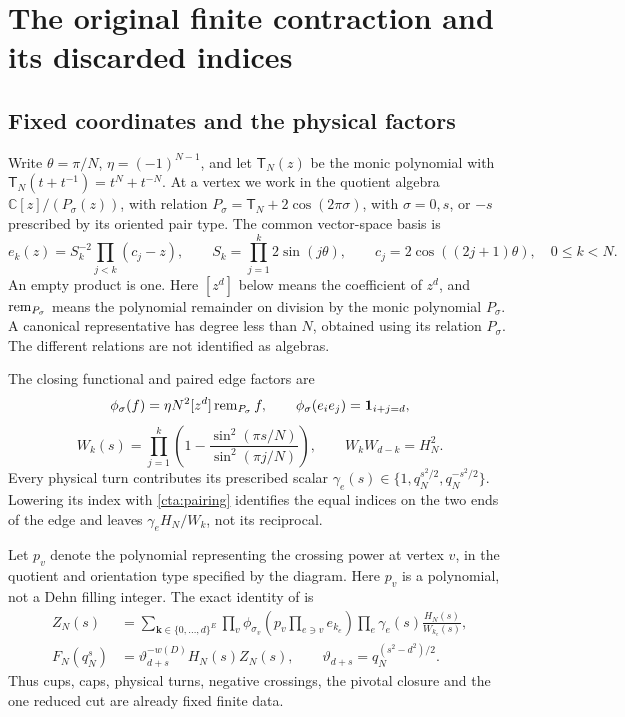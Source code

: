 \section{The original finite contraction and its discarded indices}
\label{cta:finite}

\subsection{Fixed coordinates and the physical factors}
Write \(\theta=\pi/N\), \(\eta=(-1)^{N-1}\), and let
\(\mathsf T_N(z)\) be the monic polynomial with
\(\mathsf T_N(t+t^{-1})=t^N+t^{-N}\). At a vertex we work in the quotient algebra
$\mathbb C[z]/(P_\sigma(z))$, with relation \(P_\sigma=\mathsf T_N+2\cos(2\pi\sigma)\), with
\(\sigma=0,s\), or \(-s\) prescribed by its oriented pair type.
The common vector-space basis is
\begin{equation}\label{cta:basis}
 e_k(z)=S_k^{-2}\prod_{j<k}(c_j-z),\qquad
 S_k=\prod_{j=1}^k2\sin(j\theta),\qquad
 c_j=2\cos((2j+1)\theta),\quad 0\le k<N.
\end{equation}
An empty product is one. Here $[z^d]$ below means the coefficient of $z^d$, and
$\operatorname{rem}_{P_\sigma}$ means the polynomial remainder on division by
the monic polynomial $P_\sigma$. A canonical representative has degree
less than \(N\), obtained using its relation \(P_\sigma\).
The different relations are not identified as algebras.

The closing functional and paired edge factors are
\begin{equation}\label{cta:pairing}
 \phi_\sigma(f)=\eta N^2[z^d]\operatorname{rem}_{P_\sigma}f,\qquad
 \phi_\sigma(e_i e_j)=\mathbf1_{i+j=d},
\end{equation}
\begin{equation}\label{cta:edge-factor}
 W_k(s)=\prod_{j=1}^k
  \left(1-\frac{\sin^2(\pi s/N)}{\sin^2(\pi j/N)}\right),
 \qquad W_kW_{d-k}=H_N^2.
\end{equation}
Every physical turn contributes its prescribed scalar
\(\gamma_e(s)\in\{1,q_N^{s^2/2},q_N^{-s^2/2}\}\).
Lowering its index with \eqref{cta:pairing} identifies the equal
indices on the two ends of the edge and leaves
\(\gamma_e H_N/W_k\), not its reciprocal.

Let \(p_v\) denote the polynomial representing the crossing
power at vertex $v$, in the quotient and orientation type specified
by the diagram. Here $p_v$ is a polynomial, not a Dehn filling integer. The exact identity
of \cite[Theorem~7.1]{Meridian} is
\begin{equation}\label{cta:exact-source}
 \begin{split}
 Z_N(s)&=\sum_{\boldsymbol k\in\{0,\ldots,d\}^{E}}
       \prod_v\phi_{\sigma_v}
           \left(p_v\prod_{e\ni v}e_{k_e}\right)
       \prod_e\gamma_e(s)\frac{H_N(s)}{W_{k_e}(s)},\\
 F_N(q_N^s)&=\vartheta_{d+s}^{-w(D)}H_N(s)Z_N(s),
 \qquad \vartheta_{d+s}=q_N^{(s^2-d^2)/2}.
 \end{split}
\end{equation}
Thus cups, caps, physical turns, negative crossings, the pivotal
closure and the one reduced cut are already fixed finite data.

